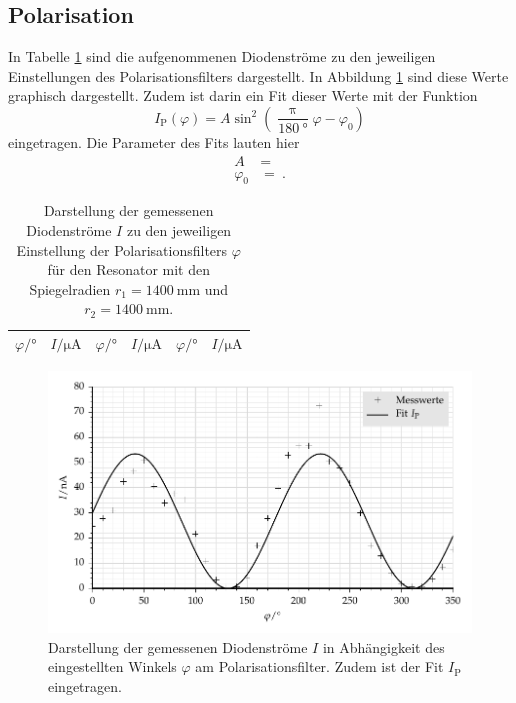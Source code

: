 \clearpage
\subsection{Polarisation}
\label{sec:Polarisation}

In Tabelle \ref{tab:P} sind die aufgenommenen Diodenströme zu den jeweiligen
Einstellungen des Polarisationsfilters dargestellt.
In Abbildung \ref{fig:P} sind diese Werte graphisch dargestellt.
Zudem ist darin ein Fit dieser Werte mit der Funktion
%
\begin{equation}
	I_\text{P}(\varphi) = A \sin^2\left(
		\frac{\uppi}{\SI{180}{\degree}} \varphi - \varphi_0
		\right)
\end{equation}
%
eingetragen.
Die Parameter des Fits lauten hier
%
\begin{align}
	A &=  \\
	\varphi_0 &=  ~.
\end{align}

\begin{table}[hb]
	\centering
	\begin{tabular}{cc|cc|cc}
		\midrule
		\midrule
		$\varphi/\si{\degree}$ & $I/\si{\uA}$ &
		$\varphi/\si{\degree}$ & $I/\si{\uA}$ &
		$\varphi/\si{\degree}$ & $I/\si{\uA}$ \\
		\midrule
		
		\midrule
		\midrule
	\end{tabular}
	\caption{Darstellung der gemessenen Diodenströme $I$ zu den jeweiligen
		Einstellung der Polarisationsfilters $\varphi$
		für den Resonator mit den Spiegelradien
		$r_1 = \SI{1400}{\milli\meter}$ und $r_2 = \SI{1400}{\milli\meter}$.}
	\label{tab:P}
\end{table}

\begin{figure}[h!]
	\centering
	\includegraphics{bilder/fig_P.pdf}
	\caption{Darstellung der gemessenen Diodenströme $I$ in Abhängigkeit des
	eingestellten Winkels $\varphi$ am Polarisationsfilter.
	Zudem ist der Fit $I_\text{P}$ eingetragen.}
	\label{fig:P}
\end{figure}

